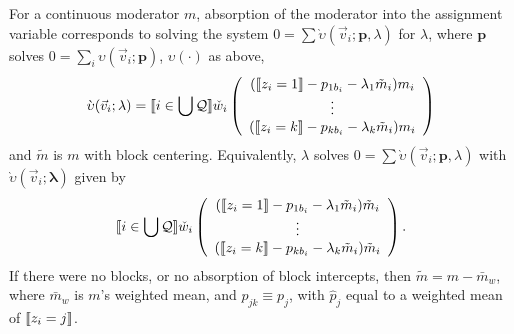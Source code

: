 \documentclass{article}
\DeclarePairedDelimiter{\indicator}{\llbracket}{\rrbracket}
\newcommand{\owt}[1][{[z_{i}]}]{\ensuremath{\check{w}_{i#1}}}
\newcommand{\absorbInterceptsEF}{\upsilon}
\newcommand{\absorbModeratorEF}{\grave{\upsilon}}
\begin{document}
For a continuous moderator $m$, absorption of the moderator into the assignment variable
corresponds to solving the system $0 = \sum
\absorbModeratorEF(\vec{v}_{i}; \mathbf{p},{\lambda})$ for
$\lambda$, where $\mathbf{p}$ solves $0 =
\sum_{i}\absorbInterceptsEF(\vec{v}_{i}; \mathbf{p})$,
$\absorbInterceptsEF(\cdot)$ as above,
\begin{equation}
  \label{eq:18}
    \absorbModeratorEF(\vec{v}_{i}; \mathbf{\lambda})=
    \indicator{i \in \bigcup \mathcal{Q}} \owt[]
     \left(
       \begin{array}{c}
         (
         \indicator{z_{i}=1}-p_{1b_{i}}-\lambda_{1}
         \tilde{m}_{i}
         )m_{i} \\
         \vdots\\
         (\indicator{z_{i}=k}-p_{kb_{i}}
         - \lambda_{k} \tilde{m}_{i})m_{i}\\
       \end{array}
  \right)%
\end{equation}
and $\tilde{m}$ is $m$ with block centering. Equivalently, $\lambda$
solves $0 = \sum
\absorbModeratorEF(\vec{v}_{i}; \mathbf{p},{\lambda})$ with
$\absorbModeratorEF(\vec{v}_{i}; \mathbf{\lambda})$ given by
\begin{equation*}
    \indicator{i \in \bigcup \mathcal{Q}} \owt[]
     \left(
       \begin{array}{c}
         (\indicator{z_{i}=1}-p_{1b_{i}}-\lambda_{1}
         \tilde{m}_{i})\tilde{m}_{i} \\
         \vdots\\
         (\indicator{z_{i}=k}-p_{kb_{i}}
         - \lambda_{k} \tilde{m}_{i})\tilde{m}_{i}\\
       \end{array}
     \right).
\end{equation*}
If there were no blocks,
or no absorption of block intercepts, then $\tilde{m} = m -
\bar{m}_{w}$,  where $\bar{m}_{w}$ is $m$'s weighted mean, and $p_{jk}
\equiv p_{j}$, with $\hat{p}_{j}$ equal to a weighted mean of
$\indicator{z_{i}=j}$.
\end{document}
